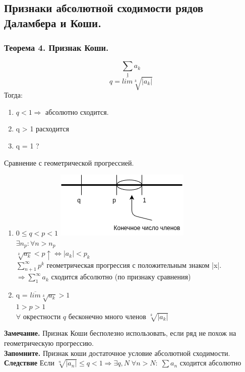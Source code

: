 \documentclass[12pt, a4paper]{article}
\begin{document}
\begin{centering}
\subsection{Признаки абсолютной сходимости рядов Даламбера и Коши.}

\subsubsection{Теорема 4. Признак Коши.}
\[ \sum_1  a_k\]
\[q = \overline{lim} \sqrt[k]{|a_k|} \]
Тогда:
\begin{enumerate}
    \item $q < 1 \Rightarrow$ абсолютно сходится.
    \item q > 1 расходится
    \item q = 1 ?
\end{enumerate}
\begin{tcolorbox}[title=Доказательство]
    Сравнение с геометрической прогрессией.\\
    \begin{enumerate}
        \item $ 0 \leq q < p < 1 $
        \includegraphics[width=0.5\linewidth]{Ряды/Признак Коши Док-во.png}\\
        $\exists n_p: \forall n>n_p$\\
        $\sqrt[k]{a_k} < p \uparrow \Leftrightarrow |a_k| < p_k$\\
        $\sum^{\infty}_{n+1} p^k$ геометрическая прогрессия с положительным знаком |x|.\\
        $\Rightarrow \sum^{\infty}_{1} a_k$ сходится абсолютно (по признаку сравнения)
        \item q = $\overline{lim} \sqrt[k]{a_k} > 1$\\
        $1 > p > 1$\\
        $\forall$ окрестности $q$ бесконечно много членов $\sqrt[k]{|a_k|} $
    \end{enumerate}
\end{tcolorbox}
\textbf{Замечание.} Признак Коши бесполезно использовать, если ряд не похож на геометрическую прогрессию.\\
\textbf{Запомните.} Признак коши достаточное условие абсолютной сходимости.\\
\textbf{Следствие} Если $ \sqrt[n]{|a_n|} \leq q < 1 \Rightarrow \exists q,N\; \forall n > N: \;  \sum a_n$ сходится абсолютно


\end{centering}
\end{document}
